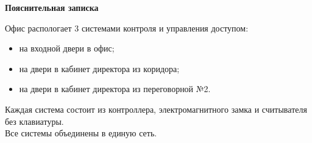 \documentclass[a4paper,14pt]{extarticle}
\begin{document}
    \textbf{Пояснительная записка}
    \begin{spacing}{1.25}
        Офис распологает 3 системами контроля и управления доступом:
        \vspace{-1ex}
        \begin{spacing}{0.5}
            \begin{itemize}
                \item на входной двери в офис;
                \item на двери в кабинет директора из коридора;
                \item на двери в кабинет директора из переговорной №2.
            \end{itemize}
        \end{spacing}
        Каждая система состоит из контроллера, электромагнитного замка и считывателя без клавиатуры.\\ 
        Все системы объединены в единую сеть.
    \end{spacing}



 
    


    
    
\end{document}
